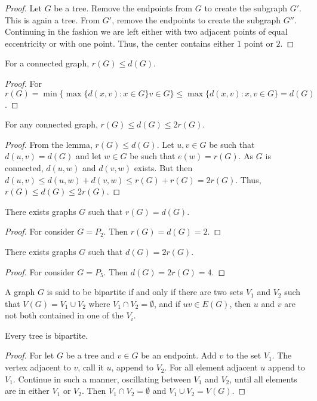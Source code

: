     \begin{proof}
    Let $G$ be a tree. Remove the endpoints from $G$ to create the subgraph $G'$. This is again a tree. From $G'$, remove the endpoints to create the subgraph $G''$. Continuing in the fashion we are left either with two adjacent points of equal eccentricity or with one point. Thus, the center contains either $1$ point or $2$.
    \end{proof}
    \begin{theorem}
    For a connected graph, $r(G) \leq d(G)$.
    \end{theorem}
    \begin{proof}
    For $r(G) = \min\{\max\{d(x,v):x\in G\} v\in G\} \leq \max\{d(x,v):x,v\in G\}=d(G)$.
    \end{proof}
    \begin{theorem}
    For any connected graph, $r(G) \leq d(G) \leq 2r(G)$.
    \end{theorem}
    \begin{proof}
    From the lemma, $r(G) \leq d(G)$. Let $u,v\in G$ be such that $d(u,v)=d(G)$ and let $w\in G$ be such that $e(w) = r(G)$. As $G$ is connected, $d(u,w)$ and $d(v,w)$ exists. But then $d(u,v)\leq d(u,w)+d(v,w) \leq r(G)+r(G)=2r(G)$. Thus, $r(G)\leq d(G)\leq 2r(G)$.
    \end{proof}
    \begin{theorem}
    There exists graphs $G$ such that $r(G) = d(G)$.
    \end{theorem}
    \begin{proof}
    For consider $G=P_2$. Then $r(G) = d(G) = 2$.
    \end{proof}
    \begin{theorem}
    There exists graphs $G$ such that $d(G) = 2r(G)$.
    \end{theorem}
    \begin{proof}
    For consider $G=P_5$. Then $d(G) = 2r(G) = 4$.
    \end{proof}
    \begin{definition}
    A graph $G$ is said to be bipartite if and only if there are two sets $V_1$ and $V_2$ such that $V(G) = V_1\cup V_2$ where $V_1\cap V_2 = \emptyset$, and if $uv \in E(G)$, then $u$ and $v$ are not both contained in one of the $V_i$.
    \end{definition}
    \begin{theorem}
    Every tree is bipartite.
    \end{theorem}
    \begin{proof}
    For let $G$ be a tree and $v\in G$ be an endpoint. Add $v$ to the set $V_1$. The vertex adjacent to $v$, call it $u$, append to $V_2$. For all element adjacent $u$ append to $V_1$. Continue in such a manner, oscillating between $V_1$ and $V_2$, until all elements are in either $V_1$ or $V_2$. Then $V_1 \cap V_2 = \emptyset$ and $V_1 \cup V_2 = V(G)$.
    \end{proof}
